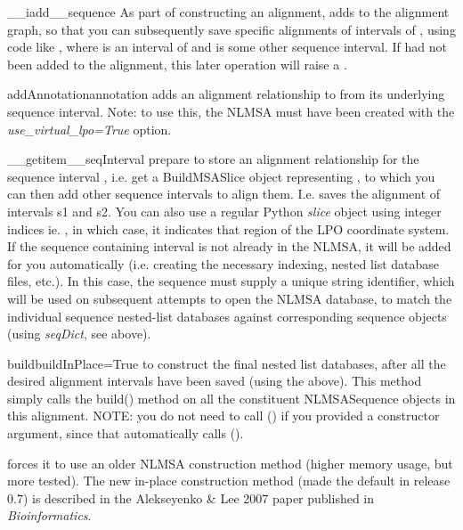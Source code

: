 \documentclass{howto}
\begin{document}
\begin{funcdesc}{__iadd__}{sequence}
  As part of constructing an alignment, adds  to the alignment graph,
  so that you can subsequently save specific alignments of intervals of
  , using code like , where  is
  an interval of  and  is some other sequence interval.
  If  had not been added to the alignment, this later operation
  will raise a .
\end{funcdesc}

\begin{funcdesc}{addAnnotation}{annotation}
  adds an alignment relationship to  from its underlying
  sequence interval.  Note: to use this, the NLMSA must have been created with the
  {\em use_virtual_lpo=True} option.
\end{funcdesc}

\begin{funcdesc}{__getitem__}{seqInterval}
  prepare to store an alignment relationship for the sequence interval ,
  i.e. get a BuildMSASlice object representing , to which you can
  then add other sequence intervals to align them.  I.e. 
  saves the alignment of intervals s1 and s2.
  You can also use a regular Python {\em slice} object using integer indices
  ie. , in which case, it indicates that 
  region of the LPO coordinate system.
  If the sequence containing
  interval  is not already in the NLMSA, it will be added for you automatically
  (i.e. creating the necessary indexing, nested list database files, etc.).  In this
  case, the sequence must supply a unique string identifier, which will be used
  on subsequent attempts to open the NLMSA database, to match the individual sequence
  nested-list databases against corresponding sequence objects (using {\em seqDict},
  see above).
\end{funcdesc}


\begin{funcdesc}{build}{buildInPlace=True}
  to construct the final nested list databases,
  after all the desired alignment intervals have been saved (using the
   above).  This method
  simply calls the build() method on all the constituent NLMSASequence objects
  in this alignment.  NOTE: you do not need to call () if
  you provided a  constructor argument, since that automatically
  calls ().

   forces it to use an older NLMSA construction method
  (higher memory usage, but more tested).  The new in-place construction method
  (made the default in release 0.7) is described in the Alekseyenko \& Lee 2007
  paper published in {\em Bioinformatics}.
\end{funcdesc}
\end{document}
